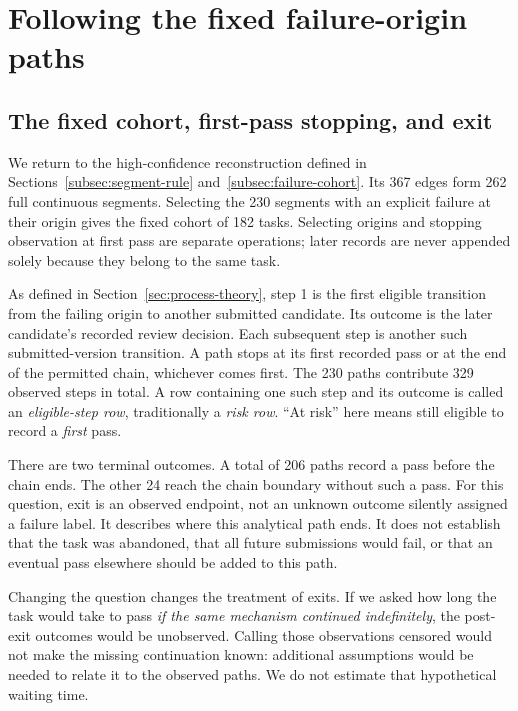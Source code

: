 \section{Following the fixed failure-origin paths}
\label{sec:process}

\subsection{The fixed cohort, first-pass stopping, and exit}
\label{subsec:process-cohort}
We return to the high-confidence reconstruction defined in Sections~\ref{subsec:segment-rule} and~\ref{subsec:failure-cohort}. Its 367 edges form 262 full continuous segments. Selecting the 230 segments with an explicit failure at their origin gives the fixed cohort of 182 tasks. Selecting origins and stopping observation at first pass are separate operations; later records are never appended solely because they belong to the same task.

As defined in Section~\ref{sec:process-theory}, step 1 is the first eligible transition from the failing origin to another submitted candidate. Its outcome is the later candidate's recorded review decision. Each subsequent step is another such submitted-version transition. A path stops at its first recorded pass or at the end of the permitted chain, whichever comes first. The 230 paths contribute 329 observed steps in total. A row containing one such step and its outcome is called an \emph{eligible-step row}, traditionally a \emph{risk row}. ``At risk'' here means still eligible to record a \emph{first} pass.

There are two terminal outcomes. A total of 206 paths record a pass before the chain ends. The other 24 reach the chain boundary without such a pass. For this question, exit is an observed endpoint, not an unknown outcome silently assigned a failure label. It describes where this analytical path ends. It does not establish that the task was abandoned, that all future submissions would fail, or that an eventual pass elsewhere should be added to this path.

Changing the question changes the treatment of exits. If we asked how long the task would take to pass \emph{if the same mechanism continued indefinitely}, the post-exit outcomes would be unobserved. Calling those observations censored would not make the missing continuation known: additional assumptions would be needed to relate it to the observed paths. We do not estimate that hypothetical waiting time.

